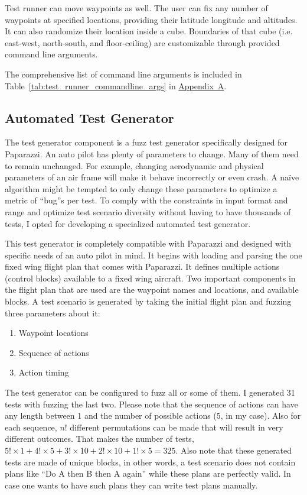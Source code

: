 Test runner can move waypoints as well. The user can fix any number of waypoints at specified locations, providing their latitude longitude and altitudes. It can also randomize their location inside a cube. Boundaries of that cube (i.e. east-west, north-south, and floor-ceiling) are customizable through provided command line arguments.

The comprehensive list of command line arguments is included in Table~\ref{tab:test_runner_commandline_args} in \hyperref[appendixa]{Appendix~A}.


\subsection{Automated Test Generator}
The test generator component is a fuzz test generator specifically designed for Paparazzi. An auto pilot has plenty of parameters to change. Many of them need to remain unchanged. For example, changing aerodynamic and physical parameters of an air frame will make it behave incorrectly or even crash. A naïve algorithm might be tempted to only change these parameters to optimize a metric of ``bug''s per test. To comply with the constraints in input format and range and optimize test scenario diversity without having to have thousands of tests, I opted for developing a specialized automated test generator. 

This test generator is completely compatible with Paparazzi and designed with specific needs of an auto pilot in mind. It begins with loading and parsing the one fixed wing flight plan that comes with Paparazzi. It defines multiple actions (control blocks) available to a fixed wing aircraft. Two important components in the flight plan that are used are the waypoint names and locations, and available blocks. A test scenario is generated by taking the initial flight plan and fuzzing three parameters about it:
\begin{enumerate}
    \item Waypoint locations
    \item Sequence of actions 
    \item Action timing
\end{enumerate}

The test generator can be configured to fuzz all or some of them. I generated 31 tests with fuzzing the last two. Please note that the sequence of actions can have any length between 1 and the number of possible actions (5, in my case). Also for each sequence, $n!$ different permutations can be made that will result in very different outcomes. That makes the number of tests, $5!\times1+4!\times5+3!\times10+2!\times10+1!\times5=325$. Also note that these generated tests are made of unique blocks, in other words, a test scenario does not contain plans like ``Do A then B then A again'' while these plans are perfectly valid. In case one wants to have such plans they can write test plans manually.

